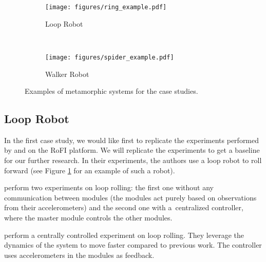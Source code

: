 \begin{figure}[!t]
    \centering
    \begin{subfigure}[b]{0.45\textwidth}
        \texttt{[image: figures/ring\_example.pdf]}
        \caption{Loop Robot}
        \label{fig:example_roller}
    \end{subfigure}
    ~
    \begin{subfigure}[b]{0.45\textwidth}
        \texttt{[image: figures/spider\_example.pdf]}
        \caption{Walker Robot}
        \label{fig:example_spider}
    \end{subfigure}

    \caption{Examples of metamorphic systems for the case studies.}
\end{figure}

\subsection{Loop Robot}

In the first case study, we would like first to replicate the experiments
performed by \textcite{superbotroller} and
\textcite{DBLP:journals/ijrr/SastraCY09} on the RoFI platform. We will replicate
the experiments to get a baseline for our further research. In their
experiments, the authors use a loop robot to roll forward (see Figure
\ref{fig:example_roller} for an example of such a robot).

\textcite{superbotroller} perform two experiments on loop rolling: the first one
without any communication between modules (the modules act purely based on
observations from their accelerometers) and the second one with a~centralized
controller, where the master module controls the other modules.

\textcite{DBLP:journals/ijrr/SastraCY09} perform a centrally controlled
experiment on loop rolling. They leverage the dynamics of the system to move
faster compared to previous work. The controller uses accelerometers in the
modules as feedback.


